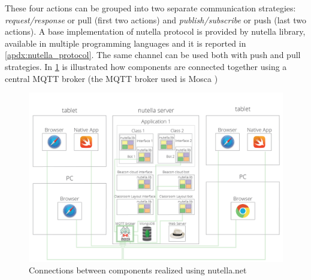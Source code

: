 These four actions can be grouped into two separate communication strategies: \textit{request/response} or pull (first two actions) and \textit{publish/subscribe} or push (last two actions). A base implementation of nutella protocol is provided by nutella library, available in multiple programming languages \cite{nutella_framework} and it is reported in \autoref{apdx:nutella_protocol}. The same channel can be used both with push and pull strategies. In \ref{fig:nutella_overview} is illustrated how components are connected together using a central MQTT broker (the MQTT broker used is Mosca \cite{Mosca})

\begin{figure}
\centering
\includegraphics[width=6in]{images/nutella-client-server-broker.png}
\caption{Connections between components realized using nutella.net}
\label{fig:nutella_overview}
\end{figure}

